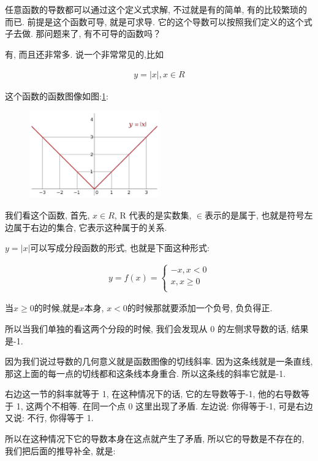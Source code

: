 任意函数的导数都可以通过这个定义式求解, 不过就是有的简单, 有的比较繁琐的而已. 前提是这个函数可导, 就是可求导. 它的这个导数可以按照我们定义的这个式子去做. 那问题来了, 有不可导的函数吗？

有, 而且还非常多. 说一个非常常见的,比如

\begin{align*}
  y=|x|, x \in R
\end{align*}

这个函数的函数图像如图:\ref{fig:img10_2}: 

\begin{figure}[ht]
  \centering
  \includegraphics[width=0.5\textwidth]{asset/22572127-4cbd-4f9d-88bc-7ded3cd6940f.png}
  \caption{}
  \label{fig:img10_2}
\end{figure}

我们看这个函数, 首先, $x\in R$, R 代表的是实数集, $\in$表示的是属于, 也就是符号左边属于右边的集合, 它表示这种属于的关系. 

$y=|x|$可以写成分段函数的形式, 也就是下面这种形式: 

\begin{align*}
  y = f(x) =
  \begin{cases}
  -x, x<0 \\
  x, x \geq 0 \\
  \end{cases}
\end{align*}

当$x \geq 0$的时候,就是$x$本身, $x<0$的时候那就要添加一个负号, 负负得正. 

所以当我们单独的看这两个分段的时候, 我们会发现从 0 的左侧求导数的话, 结果是-1. 

因为我们说过导数的几何意义就是函数图像的切线斜率. 因为这条线就是一条直线, 那这上面的每一点的切线都和这条线本身重合. 所以这条线的斜率它就是-1. 

右边这一节的斜率就等于 1, 在这种情况下的话, 它的左导数等于-1, 他的右导数等于 1, 这两个不相等. 在同一个点 0 这里出现了矛盾. 左边说: 你得等于-1, 可是右边又说: 不行, 你得等于 1. 

所以在这种情况下它的导数本身在这点就产生了矛盾, 所以它的导数是不存在的, 我们把后面的推导补全, 就是: 

